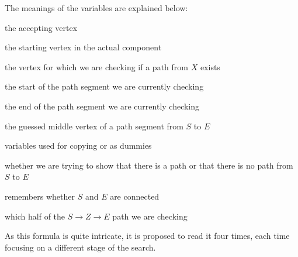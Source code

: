 The meanings of the variables are explained below:
\begin{description}
    \setlength\itemsep{0.2em}
    \item[$Y$:] the accepting vertex
    \item[$X$:] the starting vertex in the actual component
    \item[$I$:] the vertex for which we are checking if a path from $X$ exists
    \item[$S$:] the start of the path segment we are currently checking
    \item[$E$:] the end of the path segment we are currently checking
    \item[$Z, Z_{e}$:] the guessed middle vertex of a path segment from $S$ to $E$
    \item[$A, B, b_{0}$:] variables used for copying or as dummies
    \item[$b_{path}$:] whether we are trying to show that there is a path or that there is no path from $S$ to $E$
    \item[$b_{1}$:] remembers whether $S$ and $E$ are connected
    \item[$b_{2}, b_{2e}$:] which half of the $S \to Z \to E$ path we are checking
\end{description}
As this formula is quite intricate, it is proposed to read it four times, each time focusing on a different stage of the search.
